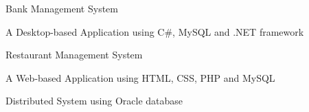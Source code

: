 \begin{cventries}
  \cventry
    {} %
    {Bank Management System} %
    {} %
    {} %
    {
      \begin{cvitems} %
        \item {A Desktop-based Application using C#, MySQL and .NET  framework}
      \end{cvitems}
    }

  \cventry
    {} %
    {Restaurant Management System} %
    {} %
    {} %
    {
      \begin{cvitems} %
        \item {A Web-based Application using HTML, CSS, PHP and MySQL}
        \item {Distributed System using Oracle database}
      \end{cvitems}
    }
\end{cventries}
